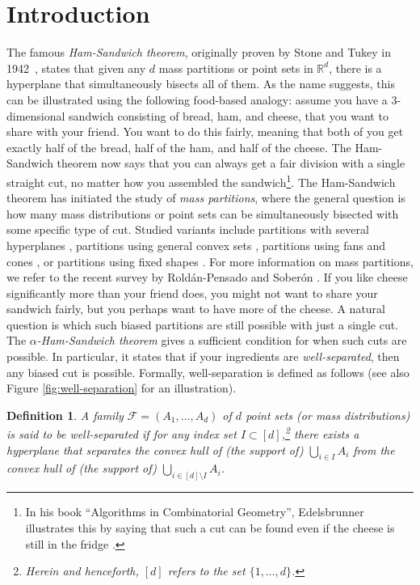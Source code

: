 \documentclass[11pt]{article}
\newtheorem{definition}[theorem]{Definition}
\newcommand{\R}{\mathbb{R}}
\begin{document}
\section{Introduction}
\label{sec:intro}
%
The famous \emph{Ham-Sandwich theorem}, originally proven by Stone and Tukey in 1942~\cite{StoneTukey}, states that given any $d$ mass partitions or point sets in $\R^d$, there is a hyperplane that simultaneously bisects all of them. As the name suggests, this can be illustrated using the following food-based analogy: assume you have a 3-dimensional sandwich consisting of bread, ham, and cheese, that you want to share with your friend. You want to do this fairly, meaning that both of you get exactly half of the bread, half of the ham, and half of the cheese. The Ham-Sandwich theorem now says that you can always get a fair division with a single straight cut, no matter how you assembled the sandwich\footnote{In his book ``Algorithms in Combinatorial Geometry'', Edelsbrunner illustrates this by saying that such a cut can be found even if the cheese is still in the fridge \cite{EdelsbrunnerBook}.}.
%
The Ham-Sandwich theorem has initiated the study of \emph{mass partitions}, where the general question is how many mass distributions or point sets can be simultaneously bisected with some specific type of cut. Studied variants include partitions with several hyperplanes \cite{Barba2019,Blagojevic2022,Hubard2020,Hubard2024,Schnider2021}, partitions using general convex sets \cite{Aichholzer:2018gu,Akopyan:2013jt,Blagojevic:2007ij}, partitions using fans and cones \cite{Barany:2002tk,Schnider2019,Soberon2023}, or partitions using fixed shapes \cite{cookie_cutters}. For more information on mass partitions, we refer to the recent survey by Rold\'{a}n-Pensado and Sober\'{o}n \cite{RoldanPensado2022}.
%
If you like cheese significantly more than your friend does, you might not want to share your sandwich fairly, but you perhaps want to have more of the cheese. A natural question is which such biased partitions are still possible with just a single cut. The \emph{$\alpha$-Ham-Sandwich theorem} gives a sufficient condition for when such cuts are possible. In particular, it states that if your ingredients are \emph{well-separated}, then any biased cut is possible. Formally, well-separation is defined as follows (see also Figure \ref{fig:well-separation} for an illustration).
%
\begin{definition}
    A family $\mathcal{F}=(A_1,\ldots,A_d)$ of $d$ point sets (or mass distributions) is said to be \emph{well-separated} if for any index set $I \subset [d]$,\footnote{Herein and henceforth, $[d]$ refers to the set $\{1, \dots, d\}$.} there exists a hyperplane that separates the convex hull of (the support of) $\bigcup_{i\in I}A_i$ from the convex hull of (the support of) $\bigcup_{i\in [d]\setminus I}A_i$.
\end{definition}
\end{document}
